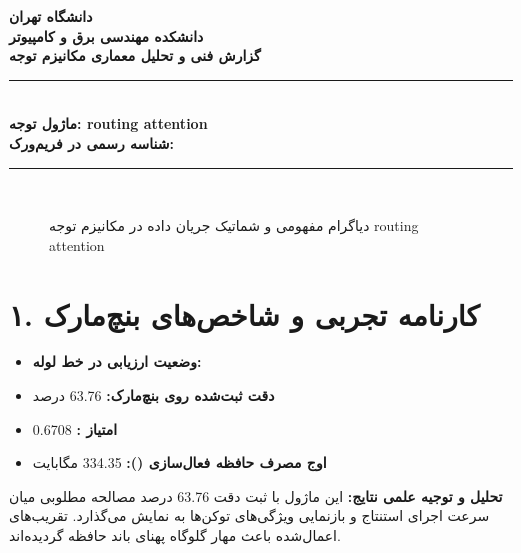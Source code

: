 \documentclass[12pt,a4paper]{article}
\begin{document}
\begin{center}
{\Large\bfseries دانشگاه تهران}\\[0.2cm]
{\large\bfseries دانشکده مهندسی برق و کامپیوتر}\\[0.2cm]
{\large\bfseries گزارش فنی و تحلیل معماری مکانیزم توجه}\\[0.5cm]
\rule{\linewidth}{1pt}\\[0.3cm]
{\LARGE\bfseries ماژول توجه: routing attention}\\[0.2cm]
{\large \textbf{شناسه رسمی در فریم‌ورک:} }\\[0.2cm]
\rule{\linewidth}{1pt}\\[0.5cm]
\end{center}

\begin{figure}[H]
\centering
{}
\caption{دیاگرام مفهومی و شماتیک جریان داده در مکانیزم توجه routing attention}
\end{figure}

\section*{۱. کارنامه تجربی و شاخص‌های بنچ‌مارک}
\begin{itemize}
\item \textbf{وضعیت ارزیابی در خط لوله:} 
\item \textbf{دقت ثبت‌شده روی بنچ‌مارک:} 63.76 درصد
\item \textbf{امتیاز :} 0.6708
\item \textbf{اوج مصرف حافظه فعال‌سازی ():} 334.35 مگابایت
\end{itemize}
\textbf{تحلیل و توجیه علمی نتایج:} این ماژول با ثبت دقت 63.76 درصد مصالحه مطلوبی میان سرعت اجرای استنتاج و بازنمایی ویژگی‌های توکن‌ها به نمایش می‌گذارد. تقریب‌های اعمال‌شده باعث مهار گلوگاه پهنای باند حافظه گردیده‌اند.
\end{document}
